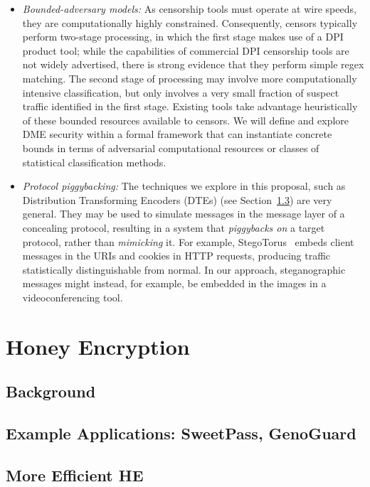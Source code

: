 \documentclass[10pt]{article}
\newcounter{mynote}[section]
\newcommand{\notecolor}{blue}
\newcommand{\note}[2]{\refstepcounter{mynote}{\bf \textcolor{\notecolor}{$\ll$#1: {\textcolor{black}{\sf #2}}$\gg$}}}
\newcommand{\noteari}[1]{\note{Ari}{#1}}
\begin{document}
\begin{itemize}
\item {\em Bounded-adversary models:} As censorship tools must operate at wire speeds, they are computationally highly constrained. Consequently, censors typically perform two-stage processing, in which the first stage makes use of a DPI product tool; while the capabilities of commercial DPI censorship tools are not widely advertised, there is strong evidence that they perform simple regex matching. The second stage of processing may involve more computationally intensive classification, but only involves a very small fraction of suspect traffic identified in the first stage. Existing tools take advantage heuristically of these bounded resources available to censors. We will define and explore DME security within a formal framework that can instantiate concrete bounds in terms of adversarial computational resources or classes of statistical classification methods.
\item {\em Protocol piggybacking:} The techniques we explore in this proposal, such as Distribution Transforming Encoders (DTEs) (see Section~\ref{}) are very general. They may be used to simulate messages in the message layer of a concealing protocol, resulting in a system that {\em piggybacks on} a target protocol, rather than {\em mimicking} it. For example, StegoTorus~\cite{} embeds client messages in the URIs and cookies in HTTP requests, producing traffic statistically distinguishable from normal. In our approach, steganographic messages might instead, for example, be embedded in the images in a videoconferencing tool. \noteari{I presume this obvious approach has been explored or is ruled out for some reason. In any case, perhaps we can briefly discuss.}
\end{itemize}

\section{Honey Encryption}
\subsection{Background}
\subsection{Example Applications: SweetPass, GenoGuard}
\subsection{More Efficient HE}
\end{document}
